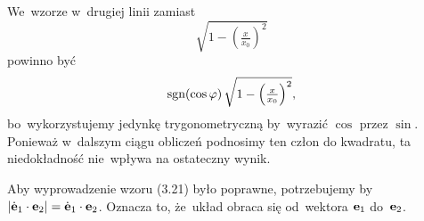 \documentclass[a4paper,11pt]{article}
\begin{document}
\noindent



\vspace{\spaceTwo}














\start {} We~wzorze w~drugiej linii zamiast
\begin{equation}
  \label{eq:SkalmierskiMechanikaZWytrzymaloscia-01}
  \sqrt{ 1 - \left( \tfrac{ x }{ x_{ 0 } } \right)^{ 2 } }
\end{equation}
powinno być
\begin{equation}
  \label{eq:SkalmierskiMechanikaZWytrzymaloscia-02}
  \textrm{sgn}( \cos \varphi ) \,
  \sqrt{ 1 - \left( \tfrac{ x }{ x_{ 0 } } \right)^{ 2 } },
\end{equation}
bo~wykorzystujemy jedynkę trygonometryczną by~wyrazić $\cos$ przez
$\sin$. Ponieważ w~dalszym ciągu obliczeń podnosimy ten człon do
kwadratu, ta niedokładność nie~wpływa na ostateczny wynik.

\vspace{\spaceFour}



\start {} Aby wyprowadzenie wzoru (3.21) było poprawne,
potrzebujemy by
$| \dot{ \mathbf{e} }_{ 1 } \cdot \mathbf{e}_{ 2 } | = \dot{ \mathbf{e} }_{ 1 }
\cdot \mathbf{e}_{ 2 }$. Oznacza to, że~układ obraca się od~wektora
$\mathbf{e}_{ 1 }$ do~$\mathbf{e}_{ 2 }$.





\end{document}
